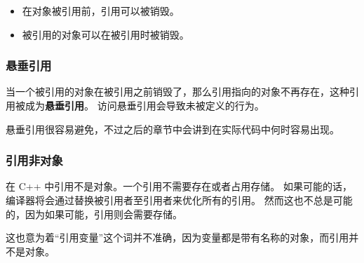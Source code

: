 \documentclass[../../LearnCpp.tex]{subfiles}
\begin{document}
\begin{itemize}
    \item 在对象被引用前，引用可以被销毁。
    \item 被引用的对象可以在被引用时被销毁。
\end{itemize}

\subsubsection*{悬垂引用}

当一个被引用的对象在被引用之前销毁了，那么引用指向的对象不再存在，这种引用被成为\textbf{悬垂引用}。
访问悬垂引用会导致未被定义的行为。

悬垂引用很容易避免，不过之后的章节中会讲到在实际代码中何时容易出现。

\subsubsection*{引用非对象}

在 C++ 中引用不是对象。一个引用不需要存在或者占用存储。
如果可能的话，编译器将会通过替换被引用者至引用者来优化所有的引用。
然而这也不总是可能的，因为如果可能，引用则会需要存储。

这也意为着“引用变量”这个词并不准确，因为变量都是带有名称的对象，而引用并不是对象。
\end{document}
